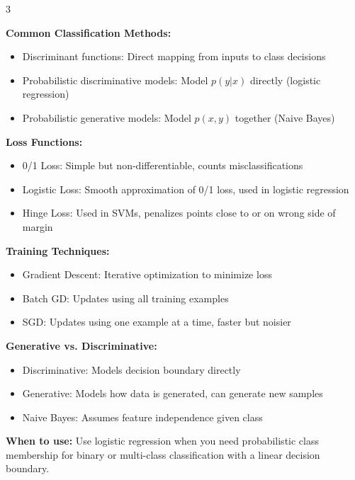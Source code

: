 \documentclass[10pt,landscape]{article}
\begin{document}
\begin{multicols}{3}
\begin{tcolorbox}[breakable, title=2. Classification Concepts, colback=classification,boxsep=1pt,left=1pt,right=1pt,top=1pt,bottom=1pt]
\textbf{Common Classification Methods:}
\begin{itemize}[leftmargin=*,noitemsep,topsep=0pt]
    \item Discriminant functions: Direct mapping from inputs to class decisions
    \item Probabilistic discriminative models: Model $p(y|x)$ directly (logistic regression)
    \item Probabilistic generative models: Model $p(x,y)$ together (Naive Bayes)
\end{itemize}

\textbf{Loss Functions:}
\begin{itemize}[leftmargin=*,noitemsep,topsep=0pt]
    \item 0/1 Loss: Simple but non-differentiable, counts misclassifications
    \item Logistic Loss: Smooth approximation of 0/1 loss, used in logistic regression
    \item Hinge Loss: Used in SVMs, penalizes points close to or on wrong side of margin
\end{itemize}

\textbf{Training Techniques:}
\begin{itemize}[leftmargin=*,noitemsep,topsep=0pt]
    \item Gradient Descent: Iterative optimization to minimize loss
    \item Batch GD: Updates using all training examples
    \item SGD: Updates using one example at a time, faster but noisier
\end{itemize}

\textbf{Generative vs. Discriminative:}
\begin{itemize}[leftmargin=*,noitemsep,topsep=0pt]
    \item Discriminative: Models decision boundary directly
    \item Generative: Models how data is generated, can generate new samples
    \item Naive Bayes: Assumes feature independence given class
\end{itemize}
\end{tcolorbox}

\begin{tcolorbox}[breakable, title=2.1 Logistic Regression Gradients, colback=classification,boxsep=1pt,left=1pt,right=1pt,top=1pt,bottom=1pt]
\textbf{When to use:} Use logistic regression when you need probabilistic class membership for binary or multi-class classification with a linear decision boundary.


\end{tcolorbox}
\end{multicols}
\end{document}
